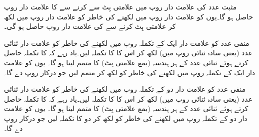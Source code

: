 	مثبت عدد  کی علامت دار روپ میں علامتی بِٹ  سے  کرنے سے  کا علامت دار روپ حاصل ہو گا۔یوں  کو علامت دار روپ میں لکھنے کی خاطر  کو علامت دار روپ  میں لکھ کر علامتی بِٹ  کرنے سے  کی علامت دار روپ  حاصل ہو گی۔
	
منفی عدد  کو علامت دار ایک کے تکملہ روپ میں لکھنے کی خاطر  کو علامت دار ثنائی عدد (یعنی سادہ ثنائی روپ میں) لکھ کر اس کا  کا تکملہ لیں۔یاد رہے کہ  کا تکملہ حاصل کرتے ہوئے ثنائی عدد کے ہر ہندسہ (بمع علامتی بِٹ) کا متمم لینا ہو گا۔ یوں  کو علامت دار ایک کے تکملہ روپ میں لکھنے کی خاطر  کو  لکھ کر متمم لیں جو درکار روپ  دے گا۔

منفی عدد  کو علامت دار دو کے تکملہ روپ میں لکھنے کی خاطر  کو علامت دار ثنائی عدد (یعنی سادہ ثنائی روپ میں) لکھ کر اس کا  کا تکملہ لیں۔یاد رہے کہ  کا تکملہ حاصل کرتے ہوئے ثنائی عدد کے ہر ہندسہ (بمع علامتی بِٹ) کا متمم لینا ہو گا۔ یوں  کو علامت دار دو کے تکملہ روپ میں لکھنے کی خاطر  کو  لکھ کر دو کا تکملہ لیں جو درکار روپ  دے گا۔
